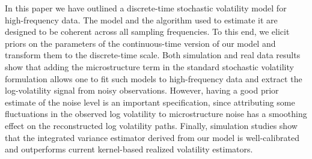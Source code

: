 In this paper we have outlined a discrete-time stochastic volatility model for high-frequency data. The model and the algorithm used to estimate it are designed to be coherent across all sampling frequencies. To this end, we elicit priors on the parameters of the continuous-time version of our model and transform them to the discrete-time scale. Both simulation and real data results show that adding the microstructure term in the standard stochastic volatility formulation allows one to fit such models to high-frequency data and extract the log-volatility signal from noisy observations. However, having a good prior estimate of the noise level is an important specification, since attributing some fluctuations in the observed log volatility to microstructure noise has a smoothing effect on the reconstructed log volatility paths. Finally, simulation studies show that the integrated variance estimator derived from our model is well-calibrated and outperforms current kernel-based realized volatility estimators.



